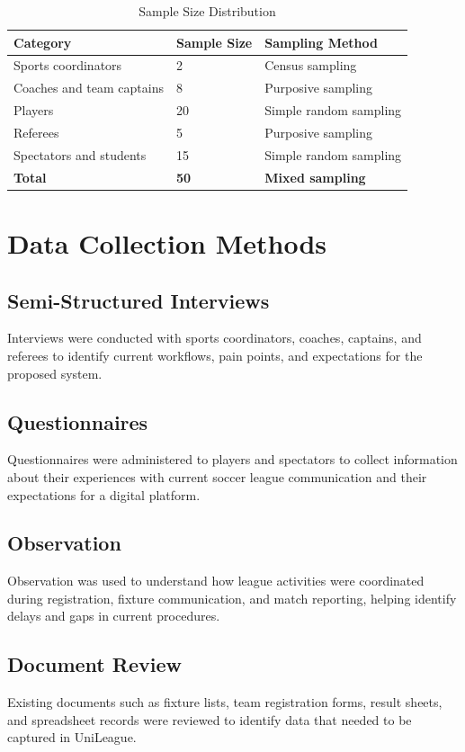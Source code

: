 \documentclass[12pt,a4paper]{report}
\begin{document}
\begin{table}[H]
\centering
\caption{Sample Size Distribution}
\begin{tabular}{p{5cm}p{4cm}p{5cm}}
\toprule
\textbf{Category} & \textbf{Sample Size} & \textbf{Sampling Method}\\
\midrule
Sports coordinators & 2 & Census sampling\\
Coaches and team captains & 8 & Purposive sampling\\
Players & 20 & Simple random sampling\\
Referees & 5 & Purposive sampling\\
Spectators and students & 15 & Simple random sampling\\
\textbf{Total} & \textbf{50} & \textbf{Mixed sampling}\\
\bottomrule
\end{tabular}
\end{table}

\section{Data Collection Methods}
\subsection{Semi-Structured Interviews}
Interviews were conducted with sports coordinators, coaches, captains, and referees to identify
current workflows, pain points, and expectations for the proposed system.

\subsection{Questionnaires}
Questionnaires were administered to players and spectators to collect information about their
experiences with current soccer league communication and their expectations for a digital platform.

\subsection{Observation}
Observation was used to understand how league activities were coordinated during registration,
fixture communication, and match reporting, helping identify delays and gaps in current procedures.

\subsection{Document Review}
Existing documents such as fixture lists, team registration forms, result sheets, and spreadsheet
records were reviewed to identify data that needed to be captured in UniLeague.
\end{document}
